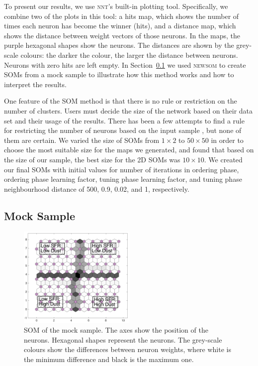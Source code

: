      To present our results, we use \textsc{nnt}'s built-in plotting tool.
     Specifically, we combine two of the plots in this tool: a hits map, which shows the number of times each neuron has become the winner (hits), and a distance map, which shows the distance between weight vectors of those neurons.
     In the maps, the purple hexagonal shapes show the neurons. 
     The distances are shown by the grey-scale colours: the darker the colour, the larger the distance between neurons.
     Neurons with zero hits are left empty.
     In Section~\ref{sec: mock_sample} we used \textsc{newsom} to create SOMs from a mock sample to illustrate how this method works and how to interpret the results.

     One feature of the SOM method is that there is no rule or restriction on the number of clusters.
     Users must decide the size of the network based on their data set and their usage of the results.
     There has been a few attempts to find a rule for restricting the number of neurons based on the input sample \citep[e.g.][]{Vesanto05}, but none of them are certain. 
     We varied the size of SOMs from $1\times2$ to $50\times50$ in order to choose the most suitable size for the maps we generated, and found that based on the size of our sample, the best size for the 2D SOMs was $10\times10$. 
     We created our final SOMs with initial values for number of iterations in ordering phase, ordering phase learning factor, tuning phase learning factor, and tuning phase neighbourhood distance of 500, 0.9, 0.02, and 1, respectively. 
     
    
\subsection{Mock Sample}
\label{sec: mock_sample}
 
         \begin{figure}
                \centering
                \includegraphics[width=0.5\textwidth]{../images0.01/mock_sample.png}
            \caption[Self-organizing map of the mock sample]{SOM of the mock sample. The axes show the position of the neurons. Hexagonal shapes represent the neurons. The grey-scale colours show the differences between neuron weights, where white is the minimum difference and black is the maximum one.}
            \label{fig: sample}
        \end{figure}
 
